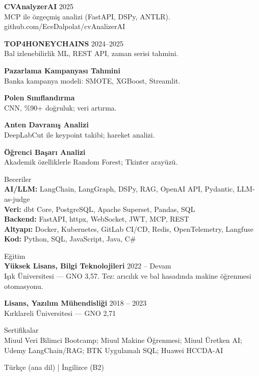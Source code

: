 \documentclass[11pt,a4paper]{article}
\newcommand{\cvsection}[1]{%
  \vspace{0.7em}%
  {\normalsize\fontseries{m}\selectfont #1}\\[0.25em]
}
\begin{document}
\vspace{0.25em}
\textbf{CVAnalyzerAI} \hfill 2025\\
MCP ile özgeçmiş analizi (FastAPI, DSPy, ANTLR). github.com/EceDalpolat/cvAnalizerAI

\vspace{0.25em}
\textbf{TOP4HONEYCHAINS} \hfill 2024--2025\\
Bal izlenebilirlik ML, REST API, zaman serisi tahmini.

\vspace{0.25em}
\textbf{Pazarlama Kampanyası Tahmini}\\
Banka kampanya modeli: SMOTE, XGBoost, Streamlit.

\vspace{0.25em}
\textbf{Polen Sınıflandırma}\\
CNN, \%90+ doğruluk; veri artırma.

\vspace{0.25em}
\textbf{Anten Davranış Analizi}\\
DeepLabCut ile keypoint takibi; hareket analizi.

\vspace{0.25em}
\textbf{Öğrenci Başarı Analizi}\\
Akademik özelliklerle Random Forest; Tkinter arayüzü.

\cvsection{Beceriler}

\textbf{AI/LLM:} LangChain, LangGraph, DSPy, RAG, OpenAI API, Pydantic, LLM-as-judge\\
\textbf{Veri:} dbt Core, PostgreSQL, Apache Superset, Pandas, SQL\\
\textbf{Backend:} FastAPI, httpx, WebSocket, JWT, MCP, REST\\
\textbf{Altyapı:} Docker, Kubernetes, GitLab CI/CD, Redis, OpenTelemetry, Langfuse\\
\textbf{Kod:} Python, SQL, JavaScript, Java, C\#

\cvsection{Eğitim}

\textbf{Yüksek Lisans, Bilgi Teknolojileri} \hfill 2022 -- Devam\\
Işık Üniversitesi --- GNO 3,57. Tez: arıcılık ve bal hasadında makine öğrenmesi otomasyonu.

\vspace{0.25em}
\textbf{Lisans, Yazılım Mühendisliği} \hfill 2018 -- 2023\\
Kırklareli Üniversitesi --- GNO 2,71

\cvsection{Sertifikalar}

Miuul Veri Bilimci Bootcamp; Miuul Makine Öğrenmesi; Miuul Üretken AI; Udemy LangChain/RAG; BTK Uygulamalı SQL; Huawei HCCDA-AI

\vspace{0.3em}
{\small Türkçe (ana dil) | İngilizce (B2)}
\end{document}
